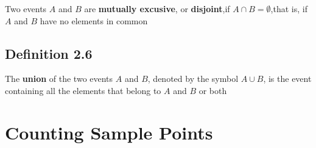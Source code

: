 \documentclass{article}
\begin{document}
Two events $A$ and $B$ are \textbf{mutually excusive}, or \textbf{disjoint},if $A\cap B=\emptyset$,that is,
if $A$ and $B$ have no elements in common 

\subsection{Definition 2.6}
The \textbf{union} of the two events $A$ and $B$, denoted by the symbol $A \cup B$,
is the event containing all the elements that belong to $A$ and $B$ or both



\section{Counting Sample Points}
\end{document}
